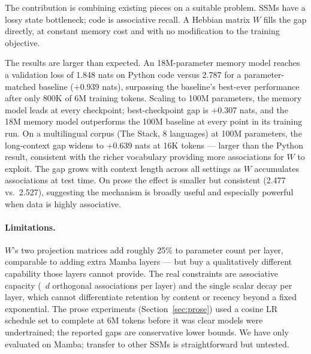 \documentclass{article}
\begin{document}
The contribution is combining existing pieces on a suitable problem. SSMs have a lossy state bottleneck; code is associative recall. A Hebbian matrix $W$ fills the gap directly, at constant memory cost and with no modification to the training objective.

The results are larger than expected. An 18M-parameter memory model reaches a validation loss of 1.848 nats on Python code versus 2.787 for a parameter-matched baseline ($+$0.939 nats), surpassing the baseline's best-ever performance after only 800K of 6M training tokens. Scaling to 100M parameters, the memory model leads at every checkpoint; best-checkpoint gap is $+$0.307 nats, and the 18M memory model outperforms the 100M baseline at every point in its training run. On a multilingual corpus (The Stack, 8 languages) at 100M parameters, the long-context gap widens to $+$0.639 nats at 16K tokens --- larger than the Python result, consistent with the richer vocabulary providing more associations for $W$ to exploit. The gap grows with context length across all settings as $W$ accumulates associations at test time. On prose the effect is smaller but consistent (2.477 vs.\ 2.527), suggesting the mechanism is broadly useful and especially powerful when data is highly associative.

\paragraph{Limitations.}
$W$'s two projection matrices add roughly 25\% to parameter count per layer, comparable to adding extra Mamba layers --- but buy a qualitatively different capability those layers cannot provide. The real constraints are associative capacity (~$d$ orthogonal associations per layer) and the single scalar decay per layer, which cannot differentiate retention by content or recency beyond a fixed exponential. The prose experiments (Section~\ref{sec:prose}) used a cosine LR schedule set to complete at 6M tokens before it was clear models were undertrained; the reported gaps are conservative lower bounds. We have only evaluated on Mamba; transfer to other SSMs is straightforward but untested.
\end{document}
